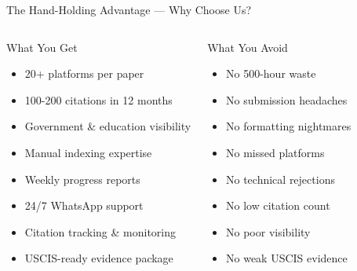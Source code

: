 \documentclass[10pt, aspectratio=169]{beamer}
\begin{document}
	\begin{frame}{The Hand-Holding Advantage — Why Choose Us?}
		\begin{columns}[T]
			\begin{block}{\textcolor{myblue}{What You Get}}
				\begin{itemize}
					\item \textcolor{mygreen}{\checkmark} 20+ platforms per paper
					\item \textcolor{mygreen}{\checkmark} 100-200 citations in 12 months
					\item \textcolor{mygreen}{\checkmark} Government \& education visibility
					\item \textcolor{mygreen}{\checkmark} Manual indexing expertise
					\item \textcolor{mygreen}{\checkmark} Weekly progress reports
					\item \textcolor{mygreen}{\checkmark} 24/7 WhatsApp support
					\item \textcolor{mygreen}{\checkmark} Citation tracking \& monitoring
					\item \textcolor{mygreen}{\checkmark} USCIS-ready evidence package
				\end{itemize}
			\end{block}
			
			\begin{block}{\textcolor{myorange}{What You Avoid}}
				\begin{itemize}
					\item \textcolor{myred}{No} 500-hour waste
					\item \textcolor{myred}{No} submission headaches
					\item \textcolor{myred}{No} formatting nightmares
					\item \textcolor{myred}{No} missed platforms
					\item \textcolor{myred}{No} technical rejections
					\item \textcolor{myred}{No} low citation count
					\item \textcolor{myred}{No} poor visibility
					\item \textcolor{myred}{No} weak USCIS evidence
				\end{itemize}
			\end{block}
		\end{columns}
		
		\vspace{0.3cm}
		\begin{center}
		\end{center}
	\end{frame}
	
\end{document}
